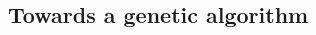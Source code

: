 \begin{multicols}{2}
\begin{center}




\subsection{\thesubsection~Towards a genetic algorithm}




\end{center}
\end{multicols}
